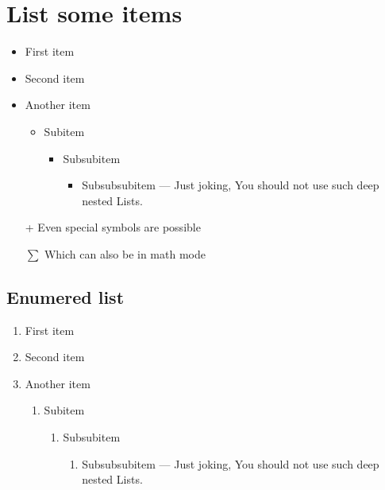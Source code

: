 \section{List some items}
\begin{itemize}
    \item First item
    \item Second item
    \item Another item
    \begin{itemize}
        \item Subitem
        \begin{itemize}
            \item Subsubitem
            \begin{itemize}
                \item Subsubsubitem --- Just joking, You should not use such 
                    deep nested Lists.
            \end{itemize}
        \end{itemize}
    \end{itemize}
    \item[+] Even special symbols are possible
    \item[$\sum$] Which can also be in math mode
\end{itemize}

\subsection{Enumered list}
\begin{enumerate}
    \item First item
    \item Second item
    \item Another item
    \begin{enumerate}
        \item Subitem
        \begin{enumerate}
            \item Subsubitem
            \begin{enumerate}
                \item Subsubsubitem --- Just joking, You should not use such 
                    deep nested Lists.

            \end{enumerate}
        \end{enumerate}
    \end{enumerate}
\end{enumerate}
